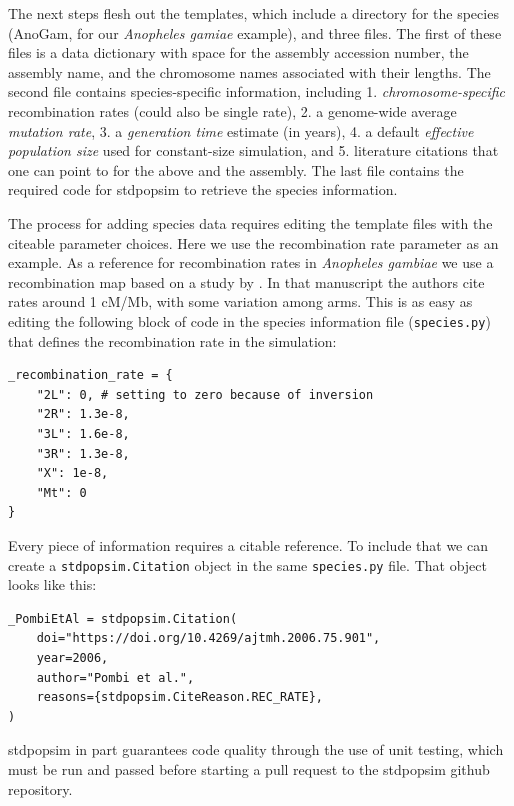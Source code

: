 \documentclass[hidelinks]{article}
\begin{document}
The next steps flesh out the templates, which include a directory for
the species (AnoGam, for our \emph{Anopheles gamiae} example), and three
files. The first of these files is a data dictionary with space for the assembly
accession number, the assembly name, and the
chromosome names associated with their lengths. The second file contains
species-specific information, including 1. \emph{chromosome-specific}
recombination rates (could also be single rate), 2. a genome-wide
average \emph{mutation rate}, 3. a \emph{generation time} estimate (in
years), 4. a default \emph{effective population size}
used for constant-size simulation, and 5. literature
citations that one can point to for the above and the assembly. The last
file contains the required code for stdpopsim to retrieve the species
information.

The process for adding species data requires editing the template files
with the citeable parameter choices. Here we use the recombination rate
parameter as an example. As a reference for recombination rates in
\emph{Anopheles gambiae} we use a recombination map based on a study
by \citep{Pombi2006}. In that manuscript
the authors cite rates around 1 cM/Mb, with some variation among
arms. This is as easy as editing the following block of code in the
species information file (\texttt{species.py}) that defines the
recombination rate in the simulation:

\begin{verbatim}
_recombination_rate = {
    "2L": 0, # setting to zero because of inversion
    "2R": 1.3e-8,
    "3L": 1.6e-8,
    "3R": 1.3e-8,
    "X": 1e-8,
    "Mt": 0
}
\end{verbatim}

Every piece of information requires a citable reference. To include that we
can create a \texttt{stdpopsim.Citation} object in the same
\texttt{species.py} file. That object looks like this:

\begin{verbatim}
_PombiEtAl = stdpopsim.Citation(
    doi="https://doi.org/10.4269/ajtmh.2006.75.901",
    year=2006,
    author="Pombi et al.",
    reasons={stdpopsim.CiteReason.REC_RATE},
)
\end{verbatim}

stdpopsim in part guarantees code quality through the use of unit
testing, which must be run and passed before starting a pull request to
the stdpopsim github repository.
\end{document}
